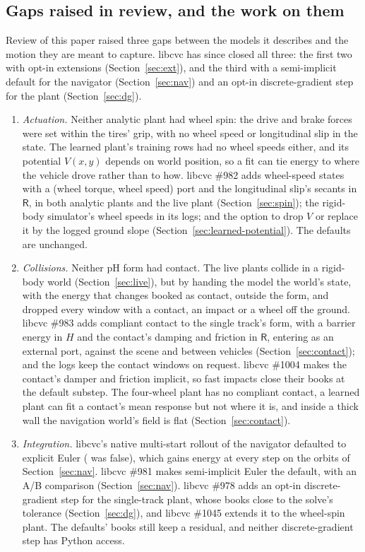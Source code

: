 \documentclass[11pt]{article}
\theoremstyle{remark}
\newcommand{\R}{\mathsf R}
\begin{document}
\subsection{Gaps raised in review, and the work on them}
\label{sec:review}
Review of this paper raised three gaps between the models it describes and the motion they are
meant to capture. libcvc has since closed all three: the first two with opt-in extensions
(Section~\ref{sec:ext}), and the third with a semi-implicit default for the navigator
(Section~\ref{sec:nav}) and an opt-in discrete-gradient step for the plant (Section~\ref{sec:dg}).
\begin{enumerate}
  \item \emph{Actuation.} Neither analytic plant had wheel spin: the drive and brake forces were
        set within the tires' grip, with no wheel speed or longitudinal slip in the state. The
        learned plant's training rows had no wheel speeds either, and its potential $V(x,y)$
        depends on world position, so a fit can tie energy to where the vehicle drove rather than
        to how. libcvc \#982 adds wheel-speed states with a (wheel torque, wheel speed) port and
        the longitudinal slip's secants in $\R$, in both analytic plants and the live plant
        (Section~\ref{sec:spin}); the rigid-body simulator's wheel speeds in its logs; and the
        option to drop $V$ or replace it by the logged ground slope
        (Section~\ref{sec:learned-potential}). The defaults are unchanged.
  \item \emph{Collisions.} Neither pH form had contact. The live plants collide in a rigid-body
        world (Section~\ref{sec:live}), but by handing the model the world's state, with the
        energy that changes booked as contact, outside the form, and  dropped
        every window with a contact, an impact or a wheel off the ground. libcvc \#983 adds
        compliant contact to the single track's form, with a barrier energy in $H$ and the
        contact's damping and friction in $\R$, entering as an external port, against the scene
        and between vehicles (Section~\ref{sec:contact}); and the logs keep the contact windows on
        request. libcvc \#1004 makes the contact's damper and friction implicit, so fast impacts
        close their books at the default substep. The four-wheel plant has no compliant contact,
        a learned plant can fit a contact's mean response but not where it is, and inside a thick
        wall the navigation world's field is flat (Section~\ref{sec:contact}).
  \item \emph{Integration.} libcvc's native multi-start rollout of the navigator defaulted to
        explicit Euler ( was false), which gains energy
        at every step on the orbits of Section~\ref{sec:nav}. libcvc \#981 makes semi-implicit
        Euler the default, with an A/B comparison (Section~\ref{sec:nav}). libcvc \#978 adds an
        opt-in discrete-gradient step for the single-track plant, whose books close to the solve's
        tolerance (Section~\ref{sec:dg}), and libcvc \#1045 extends it to the wheel-spin plant.
        The defaults' books still keep a residual, and neither discrete-gradient step has Python
        access.
\end{enumerate}
\end{document}
